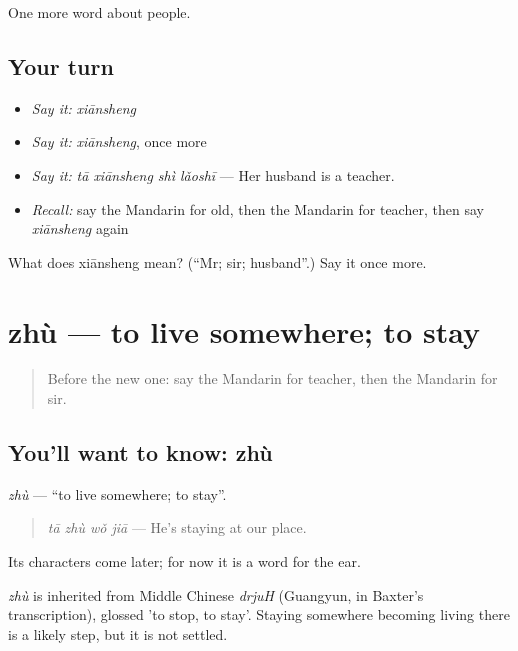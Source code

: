 \begin{grammarlens}[title={What you've built}]
One more word about people.
\end{grammarlens}

\subsection*{Your turn}
\begin{itemize}
\raggedright
  \item \emph{Say it:} \emph{xiānsheng}
  \item \emph{Say it:} \emph{xiānsheng}, once more
  \item \emph{Say it:} \emph{tā xiānsheng shì lǎoshī} — Her husband is a teacher.
  \item \emph{Recall:} say the Mandarin for old, then the Mandarin for teacher, then say \emph{xiānsheng} again
\end{itemize}

\begin{tcolorbox}[breakable,colback=teal!4,colframe=teal!35!black,title={Before you move on}]
What does xiānsheng mean? (\textquotedblleft{}Mr; sir; husband\textquotedblright{}.) Say it once more.
\end{tcolorbox}
\section[zhù]{zhù — to live somewhere; to stay}

\label{lesson:ZH-C35-zhu}



\begin{quote}
Before the new one: say the Mandarin for teacher, then the Mandarin for sir.
\end{quote}

\subsection*{You'll want to know: zhù}
\emph{zhù} — \textquotedblleft{}to live somewhere; to stay\textquotedblright{}.

\begin{quote}
\emph{tā zhù wǒ jiā} — He's staying at our place.
\end{quote}

Its characters come later; for now it is a word for the ear.

\begin{cousinweb}
\emph{zhù} is inherited from Middle Chinese \emph{drjuH} (Guangyun, in Baxter's transcription), glossed 'to stop, to stay'. Staying somewhere becoming living there is a likely step, but it is not settled.
\end{cousinweb}

